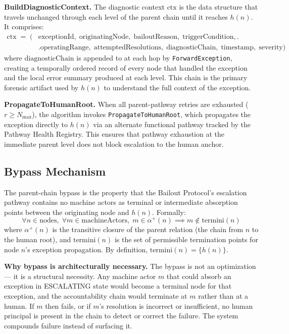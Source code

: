 \bigskip
\noindent\textbf{BuildDiagnosticContext.} The diagnostic context $\text{ctx}$ is the data structure that travels unchanged through each level of the parent chain until it reaches $h(n)$. It comprises:
\begin{align}
\text{ctx} \;=\; \bigl(&\text{exceptionId},\; \text{originatingNode},\; \text{bailoutReason},\; \text{triggerCondition}, \bigr. \tag{DC} \\
  &\bigl.\text{operatingRange},\; \text{attemptedResolutions},\; \text{diagnosticChain},\; \text{timestamp},\; \text{severity}\bigr)
\end{align}
where $\text{diagnosticChain}$ is appended to at each hop by \texttt{ForwardException}, creating a temporally ordered record of every node that handled the exception and the local error summary produced at each level. This chain is the primary forensic artifact used by $h(n)$ to understand the full context of the exception.

\bigskip
\noindent\textbf{PropagateToHumanRoot.} When all parent-pathway retries are exhausted ($r \geq N_{\max}$), the algorithm invokes \texttt{PropagateToHumanRoot}, which propagates the exception directly to $h(n)$ via an alternate functional pathway tracked by the Pathway Health Registry. This ensures that pathway exhaustion at the immediate parent level does not block escalation to the human anchor.

\subsection{Bypass Mechanism}\label{sec:bailout-bypass}

The parent-chain bypass is the property that the Bailout Protocol's escalation pathway contains no machine actors as terminal or intermediate absorption points between the originating node and $h(n)$. Formally:
\begin{equation}
\forall n \in \text{nodes},\; \forall m \in \text{machineActors},\; m \in \alpha^+(n) \implies m \notin \text{termini}(n) \tag{BP}
\end{equation}
where $\alpha^+(n)$ is the transitive closure of the parent relation (the chain from $n$ to the human root), and $\text{termini}(n)$ is the set of permissible termination points for node $n$'s exception propagation. By definition, $\text{termini}(n) = \{h(n)\}$.

\bigskip
\noindent\textbf{Why bypass is architecturally necessary.} The bypass is not an optimization --- it is a structural necessity. Any machine actor $m$ that could absorb an exception in ESCALATING state would become a terminal node for that exception, and the accountability chain would terminate at $m$ rather than at a human. If $m$ then fails, or if $m$'s resolution is incorrect or insufficient, no human principal is present in the chain to detect or correct the failure. The system compounds failure instead of surfacing it.

